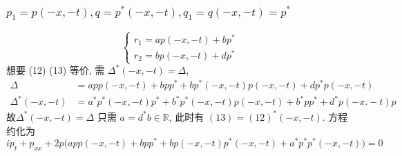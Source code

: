 \subsubsection{ $ p_{1} = p(-x,-t), q = p^{*}(-x,-t), q_{1} = q(-x,-t) = p^{*} $}
\begin{equation*}
    \begin{cases}
        r_1 = ap(-x,-t) + bp^{*} \\
        r_2 = bp(-x,-t) + dp^{*}
    \end{cases}
\end{equation*}
想要 (12) (13) 等价, 需 $ \Delta^{*}(-x,-t) = \Delta $,
\begin{equation*}
    \begin{aligned}
        \Delta &= app(-x,-t) + bpp^{*} + bp^{*}(-x,-t)p(-x,-t) + dp^{*}p(-x,-t) \\
        \Delta^{*}(-x,-t) &= a^{*}p^{*}(-x,-t)p^{*} + b^{*}p^{*}(-x,-t)p(-x,-t) + b^{*}pp^{*} + d^{*}p(-x.-t)p   
    \end{aligned}
\end{equation*}
故$ \Delta^{*}(-x,-t) = \Delta $ 只需 $ a = d^{*} b \in \mathbb{R} $, 此时有 $ (13) = (12)^{*}(-x,-t) $. 方程约化为
\begin{equation*}
    ip_t + p_{xx} + 2p \big( app(-x,-t) + bpp^{*} + bp(-x,-t)p^{*}(-x,-t) + a^{*}p^{*}p^{*}(-x,-t) \big) = 0
\end{equation*}

